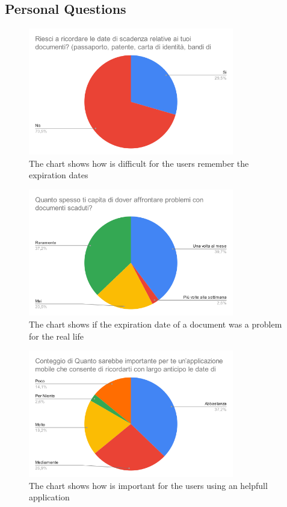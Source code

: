 \subsection{Personal Questions}
\begin{figure}[htbp]
	\centering
	\includegraphics[width=0.8\textwidth]{../Draw.io diagrams/remember_dates.png}  %
	
	\caption{The chart shows how is difficult for the users remember the expiration dates}
\end{figure}
\begin{figure}[htbp]
	\centering
	\includegraphics[width=0.8\textwidth]{../Draw.io diagrams/problems.png}  %
	
	\caption{The chart shows if the expiration date of a document was a problem for the real life}
\end{figure}
\begin{figure}[htbp]
	\centering
	\includegraphics[width=0.8\textwidth]{../Draw.io diagrams/do_you_remember_expiration_dates.png}  %
	
	\caption{The chart shows how is important for the users using an helpfull application}
\end{figure}
